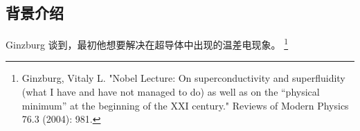 
\subsection{背景介绍}
Ginzburg 谈到，最初他想要解决在超导体中出现的温差电现象。
\footnote{Ginzburg, Vitaly L. "Nobel Lecture: On superconductivity and superfluidity (what I have and have not managed to do) as well as on the “physical minimum” at the beginning of the XXI century." Reviews of Modern Physics 76.3 (2004): 981.}